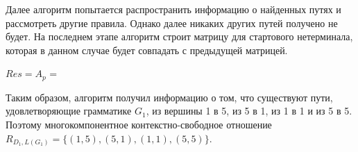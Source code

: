 Далее алгоритм попытается распространить информацию о найденных путях и рассмотреть другие правила. Однако далее никаких других путей получено не будет. На последнем этапе алгоритм строит матрицу для стартового нетерминала, которая в данном случае будет совпадать с предыдущей матрицей.

\begin{center}
	$Res = A_p$ = 
\end{center}    

Таким образом, алгоритм получил информацию о том, что существуют пути, удовлетворяющие грамматике $G_1$, из вершины 1 в 5, из 5 в 1, из 1 в 1 и из 5 в 5. Поэтому многокомпонентное контекстно-свободное отношение $R_{D_1, L(G_1)} = \{(1, 5), (5, 1), (1, 1), (5, 5)\}$. 







